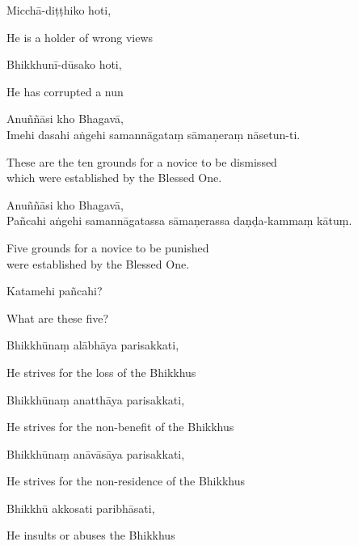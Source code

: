Micchā-diṭṭhiko hoti,

\begin{english}
  He is a holder of wrong views
\end{english}

Bhikkhunī-dūsako hoti,

\begin{english}
  He has corrupted a nun
\end{english}

Anuññāsi kho Bhagavā,\\
Imehi dasahi aṅgehi samannāgataṃ sāmaṇeraṃ nāsetun-ti.

\begin{english}
  These are the ten grounds for a novice to be dismissed\\
  which were established by the Blessed One.
\end{english}


Anuññāsi kho Bhagavā,\\
Pañcahi aṅgehi samannāgatassa sāmaṇerassa daṇḍa-kammaṃ kātuṃ.

\begin{english}
  Five grounds for a novice to be punished\\
  were established by the Blessed One.
\end{english}

Katamehi pañcahi?

\begin{english}
  What are these five?
\end{english}

Bhikkhūnaṃ alābhāya parisakkati,

\begin{english}
  He strives for the loss of the Bhikkhus
\end{english}

Bhikkhūnaṃ anatthāya parisakkati,

\begin{english}
  He strives for the non-benefit of the Bhikkhus
\end{english}

Bhikkhūnaṃ anāvāsāya parisakkati,

\begin{english}
  He strives for the non-residence of the Bhikkhus
\end{english}

Bhikkhū akkosati paribhāsati,

\begin{english}
  He insults or abuses the Bhikkhus
\end{english}

